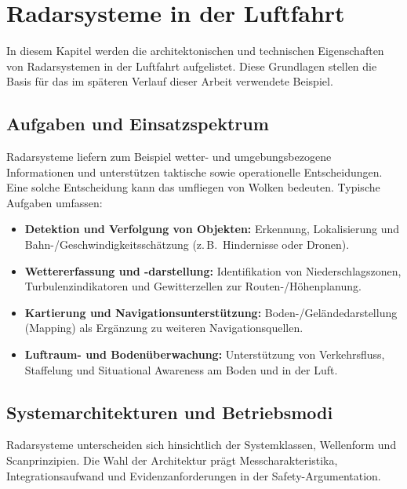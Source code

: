 \chapter{Radarsysteme in der Luftfahrt}\label{sec:grundlagen-radar}
In diesem Kapitel werden die architektonischen und technischen Eigenschaften von Radarsystemen in der Luftfahrt aufgelistet. 
Diese Grundlagen stellen die Basis für das im späteren Verlauf dieser Arbeit verwendete Beispiel. 


\section{Aufgaben und Einsatzspektrum}\label{sec:radar-aufgaben}
Radarsysteme liefern zum Beispiel wetter- und umgebungsbezogene Informationen und unterstützen taktische sowie operationelle Entscheidungen.
Eine solche Entscheidung kann das umfliegen von Wolken bedeuten. Typische Aufgaben umfassen:

\medskip
\begin{itemize}
  \item \textbf{Detektion und Verfolgung von Objekten:} Erkennung, Lokalisierung und Bahn-/Geschwindigkeitsschätzung (z.\,B.\ Hindernisse oder Dronen).
  \item \textbf{Wettererfassung und -darstellung:} Identifikation von Niederschlagszonen, Turbulenzindikatoren und Gewitterzellen zur Routen-/Höhenplanung.
  \item \textbf{Kartierung und Navigationsunterstützung:} Boden-/Geländedarstellung (Mapping) als Ergänzung zu weiteren Navigationsquellen.
  \item \textbf{Luftraum- und Bodenüberwachung:} Unterstützung von Verkehrsfluss, Staffelung und Situational Awareness am Boden und in der Luft.
\end{itemize}


\section{Systemarchitekturen und Betriebsmodi}\label{sec:radar-architektur}
Radarsysteme unterscheiden sich hinsichtlich der Systemklassen, Wellenform und Scanprinzipien. Die Wahl der Architektur
prägt Messcharakteristika, Integrationsaufwand und Evidenzanforderungen in der Safety-Argumentation.

